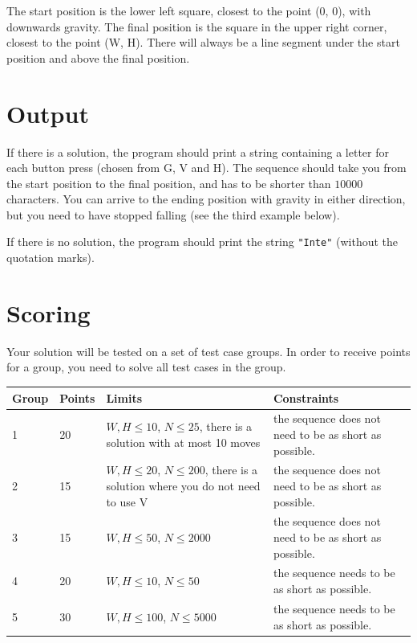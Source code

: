 The start position is the lower left square, closest to the point (0, 0), with downwards gravity. The final position is the square in the upper right corner, closest to the point (W, H). There will always be a line segment under the start position and above the final position.

\section*{Output}
If there is a solution, the program should print a string containing a letter for each button press (chosen from G, V and H). The sequence should take you from the start position to the final position, and has to be shorter than $10000$ characters. You can arrive to the ending position with gravity in either direction, but you need to have stopped falling (see the third example below).

If there is no solution, the program should print the string \texttt{"Inte"} (without the quotation marks).

\section*{Scoring}
Your solution will be tested on a set of test case groups. In order to receive points for a group, you need to solve all test cases in the group.

\begin{tabular}{| l | l | p{5cm} | p{5cm} |}
	\hline
	Group & Points & Limits & Constraints \\ \hline
  1     & 20  & $W,H \le 10$, $N \le 25$, there is a solution with at most 10 moves & the sequence does not need to be as short as possible. \\ \hline
  2     & 15  & $W,H \le 20$, $N \le 200$, there is a solution where you do not need to use V & the sequence does not need to be as short as possible. \\ \hline
  3     & 15  & $W,H \le 50$, $N \le 2000$ & the sequence does not need to be as short as possible. \\ \hline
  4     & 20  & $W,H \le 10$, $N \le 50$ & the sequence needs to be as short as possible. \\ \hline
  5     & 30  & $W,H \le 100$, $N \le 5000$ & the sequence needs to be as short as possible. \\ \hline
\end{tabular}

